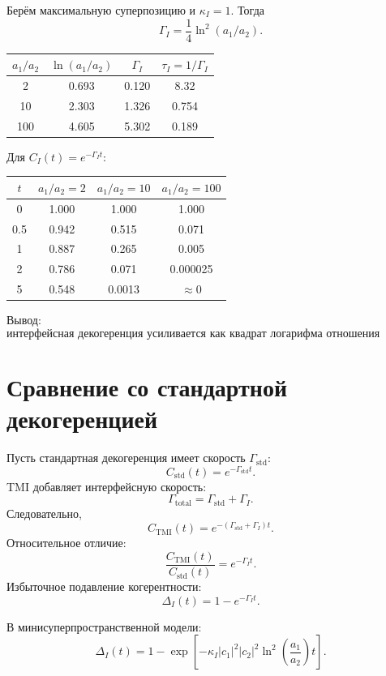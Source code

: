 \documentclass[12pt,a4paper]{article}
\newcommand{\std}{\mathrm{std}}
\begin{document}
Берём максимальную суперпозицию и \(\kappa_I=1\). Тогда
\[
\Gamma_I=\frac14\ln^2(a_1/a_2).
\]

\begin{center}
\begin{tabular}{cccc}
\toprule
\(a_1/a_2\) & \(\ln(a_1/a_2)\) & \(\Gamma_I\) & \(\tau_I=1/\Gamma_I\)\\
\midrule
2 & 0.693 & 0.120 & 8.32\\
10 & 2.303 & 1.326 & 0.754\\
100 & 4.605 & 5.302 & 0.189\\
\bottomrule
\end{tabular}
\end{center}

Для \(C_I(t)=e^{-\Gamma_I t}\):
\begin{center}
\begin{tabular}{cccc}
\toprule
\(t\) & \(a_1/a_2=2\) & \(a_1/a_2=10\) & \(a_1/a_2=100\)\\
\midrule
0 & 1.000 & 1.000 & 1.000\\
0.5 & 0.942 & 0.515 & 0.071\\
1 & 0.887 & 0.265 & 0.005\\
2 & 0.786 & 0.071 & 0.000025\\
5 & 0.548 & 0.0013 & \(\approx0\)\\
\bottomrule
\end{tabular}
\end{center}

Вывод:
\[
\boxed{
\text{интерфейсная декогеренция усиливается как квадрат логарифма отношения масштабов геометрий.}
}
\]

\section{Сравнение со стандартной декогеренцией}

Пусть стандартная декогеренция имеет скорость \(\Gamma_{\std}\):
\[
C_{\std}(t)=e^{-\Gamma_{\std}t}.
\]
TMI добавляет интерфейсную скорость:
\[
\Gamma_{\mathrm{total}}=\Gamma_{\std}+\Gamma_I.
\]
Следовательно,
\[
C_{\mathrm{TMI}}(t)=e^{-(\Gamma_{\std}+\Gamma_I)t}.
\]
Относительное отличие:
\[
\frac{C_{\mathrm{TMI}}(t)}{C_{\std}(t)}=e^{-\Gamma_I t}.
\]
Избыточное подавление когерентности:
\[
\boxed{
\Delta_I(t)=1-e^{-\Gamma_I t}.
}
\]

В минисуперпространственной модели:
\[
\boxed{
\Delta_I(t)=1-
\exp\left[-
\kappa_I |c_1|^2|c_2|^2
\ln^2\left(\frac{a_1}{a_2}\right)t
\right].
}
\]
\end{document}
